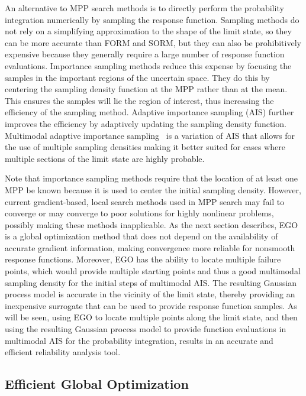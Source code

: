 An alternative to MPP search methods is to directly 
perform the probability integration numerically by sampling the 
response function.
Sampling methods do not rely on a simplifying approximation to the shape
of the limit state, so they can be more accurate than FORM and SORM, but they
can also be prohibitively expensive because they generally require a large
number of response function evaluations.
Importance sampling methods reduce this expense by focusing the samples in
the important regions of the uncertain space.
They do this by centering the sampling density function at the MPP rather
than at the mean.
This ensures the samples will lie the region of interest,
thus increasing the efficiency of the sampling method.
Adaptive importance sampling (AIS) further improves the efficiency by
adaptively updating the sampling density function.
Multimodal adaptive importance sampling~\cite{Dey98,Zou02} is a
variation of AIS that allows for the use of multiple sampling densities
making it better suited for cases where multiple sections of the limit state
are highly probable.

Note that importance sampling methods require that the location of at 
least one MPP be known because it is used to center the initial sampling 
density. However, current gradient-based, local search methods used in 
MPP search may fail to converge or may converge to poor solutions for 
highly nonlinear problems, possibly making these methods inapplicable.
As the next section describes, EGO is a global optimization method that 
does not depend on the availability of accurate gradient information, making
convergence more reliable for nonsmooth response functions.
Moreover, EGO has the ability to locate multiple failure points, 
which would provide multiple starting points and thus a good 
multimodal sampling density for the initial steps of multimodal AIS.
The resulting Gaussian process model is accurate in the
vicinity of the limit state, thereby providing an inexpensive surrogate that
can be used to provide response function samples.
As will be seen, using EGO to locate multiple points along the limit state, 
and then using the resulting Gaussian process model to provide function 
evaluations in multimodal AIS for the probability integration, 
results in an accurate and efficient reliability analysis tool.

\subsection{Efficient Global Optimization}\label{uq:reliability:global:ego}

